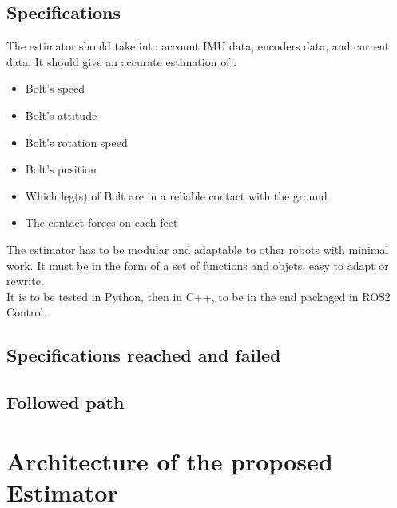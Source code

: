 \documentclass[a4paper,10pt]{article}
\begin{document}
\subsection{Specifications}
The estimator should take into account IMU data, encoders data, and current data. It should give an accurate estimation of :
\begin{itemize}
	\item{Bolt's speed}
	\item{Bolt's attitude}
	\item{Bolt's rotation speed}
	\item{Bolt's position}
	\item{Which leg(s) of Bolt are in a reliable contact with the ground}
	\item{The contact forces on each feet}
\end{itemize}
The estimator has to be modular and adaptable to other robots with minimal work. It must be in the form of a set of functions and objets, easy to adapt or rewrite.\\  
It is to be tested in Python, then in C++, to be in the end packaged in ROS2 Control. 

\subsection{Specifications reached and failed}



\subsection{Followed path}



\section{Architecture of the proposed Estimator}
\end{document}
